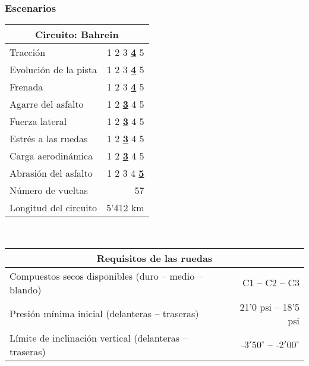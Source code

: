 \documentclass[12pt,a4paper,twoside,spanish]{article}      %
\begin{document}
\subsubsection{Escenarios}

\begin{table}[H]
    \centering
    \begin{tabular}{lr}
        \toprule
        \multicolumn{2}{c}{Circuito: \textbf{Bahrein}} \\ \midrule
        Tracción & 1 2 3 \underline{\textbf{4}} 5 \\
        Evolución de la pista & 1 2 3 \underline{\textbf{4}} 5 \\
        Frenada & 1 2 3 \underline{\textbf{4}} 5 \\
        Agarre del asfalto & 1 2 \underline{\textbf{3}} 4 5 \\
        Fuerza lateral & 1 2 \underline{\textbf{3}} 4 5 \\
        Estrés a las ruedas & 1 2 \underline{\textbf{3}} 4 5 \\
        Carga aerodinámica & 1 2 \underline{\textbf{3}} 4 5 \\
        Abrasión del asfalto & 1 2 3 4 \underline{\textbf{5}} \\
        Número de vueltas & 57 \\
        Longitud del circuito & 5'412 km \\ \bottomrule
    \end{tabular} \\ \vspace{1em}
    \begin{tabular}{lr}
        \toprule
        \multicolumn{2}{c}{\textbf{Requisitos de las ruedas}} \\ \midrule
        Compuestos secos disponibles (duro -- medio -- blando) & C1 -- C2 -- C3 \\
        Presión mínima inicial (delanteras -- traseras) & 21'0 psi -- 18'5 psi \\
        Límite de inclinación vertical (delanteras -- traseras) & -$3'50^\circ$ -- -$2'00^\circ$ \\ \bottomrule
    \end{tabular} \\ \vspace{1em}
    \begin{tabular}{lr}
        \toprule

\end{tabular}
\end{table}
\end{document}
